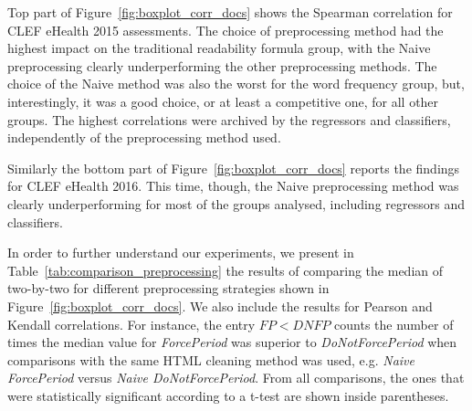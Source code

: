 
Top part of Figure~\ref{fig:boxplot_corr_docs} shows the Spearman correlation for CLEF eHealth 2015 assessments.
The choice of preprocessing method had the highest impact on the traditional readability formula group, with the Naive preprocessing clearly underperforming the other preprocessing methods. The choice of the Naive method was also the worst for the word frequency group, but, interestingly, it was a good choice, or at least a competitive one, for all other groups.
The highest correlations were archived by the regressors and classifiers, independently of the preprocessing method used.


Similarly the bottom part of Figure~\ref{fig:boxplot_corr_docs} reports the findings for CLEF eHealth 2016. 
This time, though, the Naive preprocessing method was clearly underperforming for most of the groups analysed, including regressors and classifiers.

In order to further understand our experiments, we present in Table~\ref{tab:comparison_preprocessing} the results of comparing the median of two-by-two for different preprocessing strategies shown in Figure~\ref{fig:boxplot_corr_docs}. We also include the results for Pearson and Kendall correlations.
For instance, the entry $\mathit{FP < DNFP}$ counts the number of times the median value for \textit{ForcePeriod} was superior to \textit{DoNotForcePeriod} when comparisons with the same HTML cleaning method was used, e.g. \textit{Naive ForcePeriod} versus \textit{Naive DoNotForcePeriod}. From all comparisons, the ones that were statistically significant according to a t-test are shown inside parentheses.

